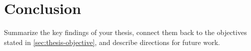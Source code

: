 
\chapter{Conclusion}
\label{ch:conclusion}

Summarize the key findings of your thesis, connect them back to the objectives
stated in \autoref{sec:thesis-objective}, and describe directions for future
work.
